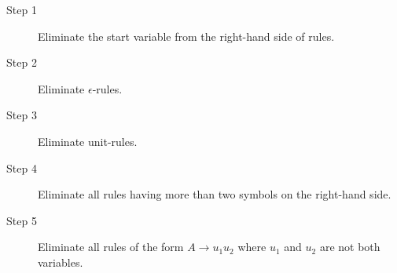\documentclass{article}
\begin{document}
\begin{enumerate}
\begin{description}
\item[Step 1] Eliminate the start variable from the right-hand side of
  rules. 

\item[Step 2] Eliminate $\epsilon$-rules.  

\item[Step 3] Eliminate unit-rules.
  
\item[Step 4] Eliminate all rules having more than two symbols on the
  right-hand side.

\item[Step 5] Eliminate all rules of the form $A\rightarrow u_1u_2$
  where $u_1$ and $u_2$ are not both variables.

\end{description}
\end{enumerate}
\end{document}

